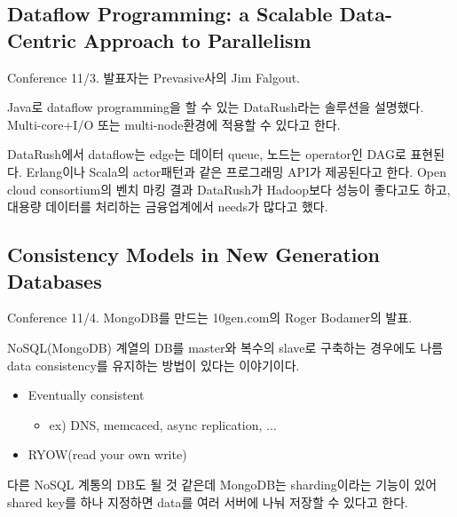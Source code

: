 \documentclass[11pt]{article}
\begin{document}


\subsection{Dataflow Programming: a Scalable
  Data-Centric Approach to Parallelism}

Conference 11/3. 발표자는 Prevasive사의 Jim Falgout.
 
Java로 dataflow programming을 할 수 있는 DataRush라는 솔루션을 설명했다.
Multi-core+I/O 또는 multi-node환경에 적용할 수 있다고 한다.
 
DataRush에서 dataflow는 edge는 데이터 queue, 노드는 operator인 DAG로 표현된다.
Erlang이나 Scala의 actor패턴과 같은 프로그래밍 API가 제공된다고 한다.
Open cloud consortium의 벤치 마킹 결과 DataRush가 Hadoop보다 성능이 좋다고도
하고, 대용량 데이터를 처리하는 금융업계에서 needs가 많다고 했다.
 
 
\subsection{Consistency Models in New Generation Databases}
Conference 11/4. MongoDB를 만드는 10gen.com의 Roger Bodamer의 발표.
 
NoSQL(MongoDB) 계열의 DB를 master와 복수의 slave로 구축하는 경우에도
나름 data consistency를 유지하는 방법이 있다는 이야기이다.
 
\begin{itemize}
\item Eventually consistent
    \begin{itemize}
    \item ex) DNS, memcaced, async replication, ...
    \end{itemize}
\item RYOW(read your own write)
\end{itemize}
 
다른 NoSQL 계통의 DB도 될 것 같은데 MongoDB는 sharding이라는 기능이
있어 shared key를 하나 지정하면 data를 여러 서버에 나눠 저장할 수
있다고 한다.
\end{document}
